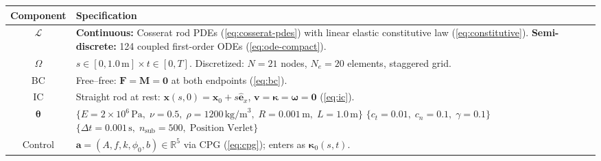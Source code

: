 \documentclass[11pt]{article}
\newcommand{\vect}[1]{\mathbf{#1}}
\newcommand{\Real}{\mathbb{R}}
\begin{document}
\begin{table}[H]
  \centering
  \renewcommand{\arraystretch}{1.4}
  \begin{tabular}{cp{11cm}}
    \toprule
    \textbf{Component} & \textbf{Specification} \\
    \midrule
    $\mathcal{L}$ &
      \textbf{Continuous:} Cosserat rod PDEs (\ref{eq:cosserat-pdes}) with linear elastic constitutive law (\ref{eq:constitutive}). \newline
      \textbf{Semi-discrete:} 124 coupled first-order ODEs (\ref{eq:ode-compact}). \\
    \midrule
    $\Omega$ &
      $s \in [0, 1.0\,\text{m}] \times t \in [0, T]$. \newline
      Discretized: $N = 21$ nodes, $N_e = 20$ elements, staggered grid. \\
    \midrule
    BC &
      Free--free: $\vect{F} = \vect{M} = \vect{0}$ at both endpoints (\ref{eq:bc}). \\
    \midrule
    IC &
      Straight rod at rest: $\vect{x}(s,0) = \vect{x}_0 + s\hat{\vect{e}}_x$, $\vect{v} = \bm{\kappa} = \bm{\omega} = \vect{0}$ (\ref{eq:ic}). \\
    \midrule
    $\bm{\theta}$ &
      $\{E = 2{\times}10^6\,\text{Pa},\; \nu = 0.5,\; \rho = 1200\,\text{kg/m}^3,\; R = 0.001\,\text{m},\; L = 1.0\,\text{m}\}$ \newline
      $\{c_t = 0.01,\; c_n = 0.1,\; \gamma = 0.1\}$ \newline
      $\{\Delta t = 0.001\,\text{s},\; n_{\text{sub}} = 500,\; \text{Position Verlet}\}$ \\
    \midrule
    Control &
      $\vect{a} = (A, f, k, \phi_0, b) \in \Real^5$ via CPG (\ref{eq:cpg}); enters as $\bm{\kappa}_0(s,t)$. \\
    \bottomrule
  \end{tabular}
\end{table}

\end{document}
